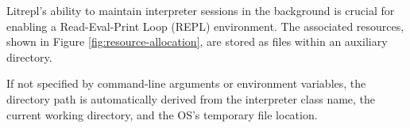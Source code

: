 \documentclass[letterpaper,12pt,twocolumn]{article}
\begin{document}

Litrepl's ability to maintain interpreter sessions in the background is crucial
for enabling a Read-Eval-Print Loop (REPL) environment. The associated
resources, shown in Figure \ref{fig:resource-allocation}, are stored as files
within an auxiliary directory.

If not specified by command-line arguments or environment variables, the
directory path is automatically derived from the interpreter class name, the
current working directory, and the OS's temporary file location.
\end{document}
